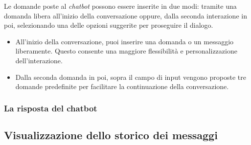 Le domande poste al \emph{chatbot} possono essere inserite in due modi: tramite una domanda libera all’inizio della conversazione oppure, dalla seconda interazione in poi, selezionando una delle opzioni suggerite per proseguire il dialogo.

\begin{itemize}
    \item All'inizio della conversazione, puoi inserire una domanda o un messaggio liberamente. Questo consente una maggiore flessibilità e personalizzazione dell'interazione.
    \item Dalla seconda domanda in poi, sopra il campo di input vengono proposte tre domande predefinite per facilitare la continuazione della conversazione.
\end{itemize}

\subsubsection{La risposta del chatbot}


\subsection{Visualizzazione dello storico dei messaggi}



